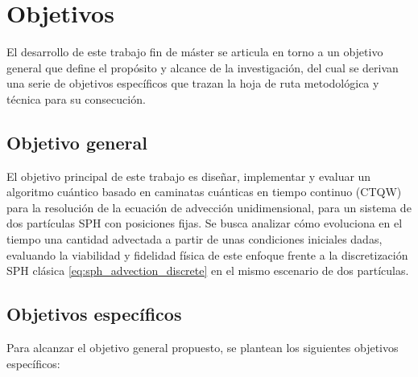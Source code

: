 
\chapter{Objetivos}
\label{ch:objetivos}

El desarrollo de este trabajo fin de máster se articula en torno a un objetivo general que define el propósito y alcance de la investigación, del cual se derivan una serie de objetivos específicos que trazan la hoja de ruta metodológica y técnica para su consecución.

\section{Objetivo general}

El objetivo principal de este trabajo es diseñar, implementar y evaluar un algoritmo cuántico basado en caminatas cuánticas en tiempo continuo (CTQW) para la resolución de la ecuación de advección unidimensional, para un sistema de dos partículas SPH con posiciones fijas. Se busca analizar cómo evoluciona en el tiempo una cantidad advectada a partir de unas condiciones iniciales dadas, evaluando la viabilidad y fidelidad física de este enfoque frente a la discretización SPH clásica \eqref{eq:sph_advection_discrete} en el mismo escenario de dos partículas.

\section{Objetivos específicos}

Para alcanzar el objetivo general propuesto, se plantean los siguientes objetivos específicos:

